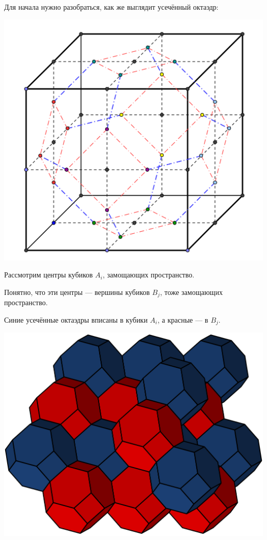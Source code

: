 \documentclass{beamer}
\begin{document}
\begin{frame}
Для начала нужно разобраться, как же выглядит усечённый октаэдр:

\vspace{-3ex}

\begin{center}
\includegraphics[width=.8\textwidth]{octahedron.png}
\end{center}

\end{frame}


\begin{frame}

Рассмотрим центры кубиков $A_i$, замощающих пространство. 

\bigskip

Понятно, что эти центры --- вершины кубиков $B_j$, тоже замощающих пространство.

\end{frame}


\begin{frame}

Синие усечённые октаэдры вписаны в кубики $A_i$, а красные  --- в $B_j$.

\begin{center}
\includegraphics[width=.8\textwidth]{Bitruncated_Cubic_Honeycomb.png}
\end{center}

\end{frame}
\end{document}
